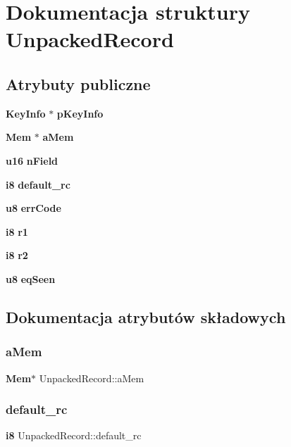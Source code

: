 \section{Dokumentacja struktury Unpacked\+Record}
\label{struct_unpacked_record}
\subsection*{Atrybuty publiczne}
\begin{DoxyCompactItemize}
\item 
\textbf{ Key\+Info} $\ast$ \textbf{ p\+Key\+Info}
\item 
\textbf{ Mem} $\ast$ \textbf{ a\+Mem}
\item 
\textbf{ u16} \textbf{ n\+Field}
\item 
\textbf{ i8} \textbf{ default\+\_\+rc}
\item 
\textbf{ u8} \textbf{ err\+Code}
\item 
\textbf{ i8} \textbf{ r1}
\item 
\textbf{ i8} \textbf{ r2}
\item 
\textbf{ u8} \textbf{ eq\+Seen}
\end{DoxyCompactItemize}


\subsection{Dokumentacja atrybutów składowych}
\mbox{\label{struct_unpacked_record_a3299c322ceb8b758dacc59701021ae9f}} 
\subsubsection{aMem}
{\footnotesize\ttfamily \textbf{ Mem}$\ast$ Unpacked\+Record\+::a\+Mem}

\mbox{\label{struct_unpacked_record_a8f18c6e59de409bf543de0965652faa9}} 
\subsubsection{default\_rc}
{\footnotesize\ttfamily \textbf{ i8} Unpacked\+Record\+::default\+\_\+rc}

\mbox{\label{struct_unpacked_record_a2efeb544b71d5e6c98b39ac845380e4e}} 

